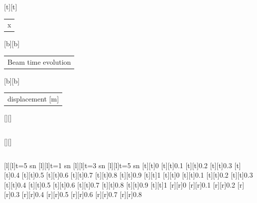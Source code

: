 %    
%
%
\begin{psfrags}%
\psfragscanon%
%
[t][t]{\color[rgb]{0,0,0}\setlength{\tabcolsep}{0pt}\begin{tabular}{c}x\end{tabular}}%
[b][b]{\color[rgb]{0,0,0}\setlength{\tabcolsep}{0pt}\begin{tabular}{c}Beam time evolution\end{tabular}}%
[b][b]{\color[rgb]{0,0,0}\setlength{\tabcolsep}{0pt}\begin{tabular}{c}displacement [m]\end{tabular}}%
[][]{\color[rgb]{0,0,0}\setlength{\tabcolsep}{0pt}\begin{tabular}{c} \end{tabular}}%
[][]{\color[rgb]{0,0,0}\setlength{\tabcolsep}{0pt}\begin{tabular}{c} \end{tabular}}%
[l][l]{\color[rgb]{0,0,0}t=5 sn}%
[l][l]{\color[rgb]{0,0,0}t=1 sn}%
[l][l]{\color[rgb]{0,0,0}t=3 sn}%
[l][l]{\color[rgb]{0,0,0}t=5 sn}%
%
[t][t]{0}%
[t][t]{0.1}%
[t][t]{0.2}%
[t][t]{0.3}%
[t][t]{0.4}%
[t][t]{0.5}%
[t][t]{0.6}%
[t][t]{0.7}%
[t][t]{0.8}%
[t][t]{0.9}%
[t][t]{1}%
[t][t]{0}%
[t][t]{0.1}%
[t][t]{0.2}%
[t][t]{0.3}%
[t][t]{0.4}%
[t][t]{0.5}%
[t][t]{0.6}%
[t][t]{0.7}%
[t][t]{0.8}%
[t][t]{0.9}%
[t][t]{1}%
%
[r][r]{0}%
[r][r]{0.1}%
[r][r]{0.2}%
[r][r]{0.3}%
[r][r]{0.4}%
[r][r]{0.5}%
[r][r]{0.6}%
[r][r]{0.7}%
[r][r]{0.8}%

\end{psfrags}
